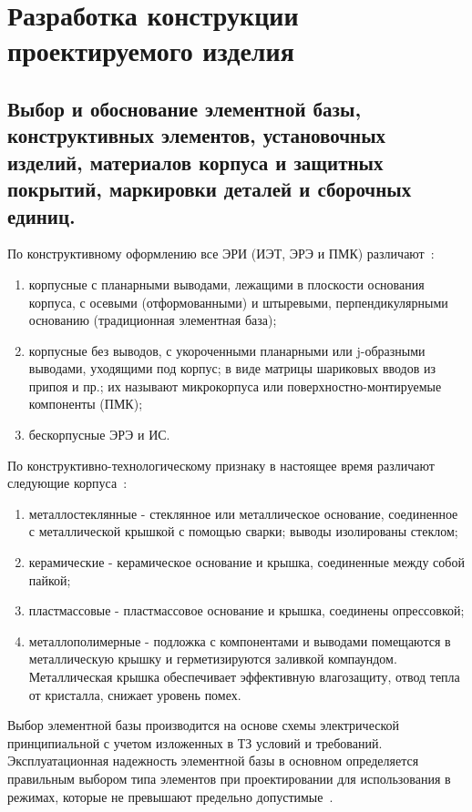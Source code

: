 \section{Разработка конструкции 
  проектируемого изделия} %

\subsection{Выбор и обоснование элементной базы,
  конструктивных элементов, 
  установочных изделий, 
  материалов корпуса и защитных покрытий,
  маркировки деталей и сборочных единиц. }

По конструктивному оформлению все ЭРИ (ИЭТ, ЭРЭ и ПМК)
различают~\cite{Belyanin2008}:
\begin{enumerate}
\item корпусные с планарными выводами, лежащими в плоскости основания
корпуса, с осевыми (отформованными) и штыревыми, перпендикулярными
основанию (традиционная элементная база);
\item  корпусные без выводов, с укороченными планарными или j-образными
выводами, уходящими под корпус; в виде матрицы шариковых вводов из
припоя и пр.; их называют микрокорпуса или поверхностно-монтируемые
компоненты (ПМК);
\item  бескорпусные ЭРЭ и ИС.
\end{enumerate}

По конструктивно-технологическому признаку в настоящее время
различают следующие корпуса~\cite{Belyanin2008}:
\begin{enumerate}
\item  металлостеклянные - стеклянное или металлическое основание,
соединенное с металлической крышкой с помощью сварки; выводы
изолированы стеклом;
\item  керамические - керамическое основание и крышка, соединенные
между собой пайкой;
\item  пластмассовые - пластмассовое основание и крышка, соединены
опрессовкой;
\item  металлополимерные - подложка с компонентами и выводами
помещаются в металлическую крышку и герметизируются заливкой
компаундом. Металлическая крышка обеспечивает эффективную влагозащиту,
отвод тепла от кристалла, снижает уровень помех.
\end{enumerate}

Выбор элементной базы производится на основе схемы электрической
принципиальной с учетом изложенных в ТЗ условий и требований.
Эксплуатационная надежность элементной базы в основном определяется
правильным выбором типа элементов при проектировании для использования
в режимах, которые не превышают предельно допустимые~\cite{Alexeev2011}.


